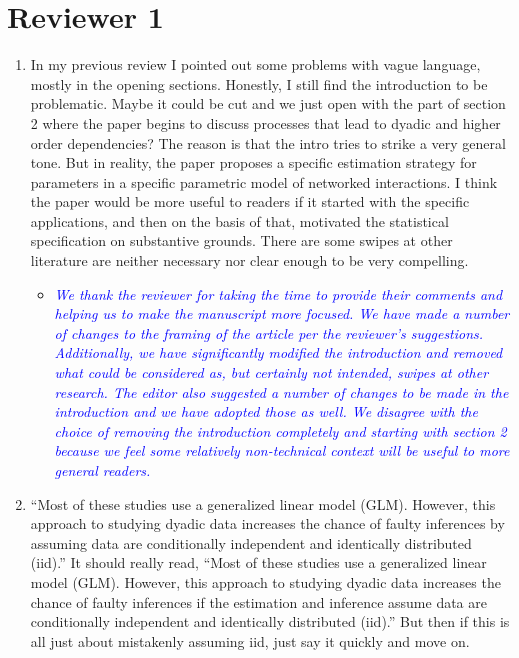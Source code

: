 \section*{Reviewer 1}

\begin{enumerate}
	\item In my previous review I pointed out some problems with vague language, mostly in the opening sections.   Honestly, I still find the introduction to be problematic. Maybe it could be cut and we just open with the part of section 2 where the paper begins to discuss processes that lead to dyadic and higher order dependencies?  The reason is that the intro tries to strike a very general tone.  But in reality, the paper proposes a specific estimation strategy for parameters in a specific parametric model of networked interactions.  I think the paper would be more useful to readers if it started with the specific applications, and then on the basis of that, motivated the statistical specification on substantive grounds.  There are some swipes at other literature are neither necessary nor clear enough to be very compelling.
	\begin{itemize}
		\item \emph{ \textcolor{blue}{
		We thank the reviewer for taking the time to provide their comments and helping us to make the manuscript more focused. We have made a number of changes to the framing of the article per the reviewer's suggestions. Additionally, we have significantly modified the introduction and removed what could be considered as, but certainly not intended, swipes at other research. The editor also suggested a number of changes to be made in the introduction and we have adopted those as well. We disagree with the choice of removing the introduction completely and starting with section 2 because we feel some relatively non-technical context will be useful to more general readers.
		}}
	\end{itemize}
	\item ``Most of these studies use a generalized linear model (GLM). However, this approach to studying dyadic data increases the chance of faulty inferences by assuming data are conditionally independent and identically distributed (iid).'' It should really read, ``Most of these studies use a generalized linear model (GLM). However, this approach to studying dyadic data increases the chance of faulty inferences if the estimation and inference assume data are conditionally independent and identically distributed (iid).''  But then if this is all just about mistakenly assuming iid, just say it quickly and move on.

\end{enumerate}
